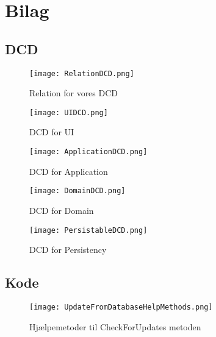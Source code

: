\section{Bilag}

\subsection{DCD}
\begin{figure}[H]
    \caption{Relation for vores DCD}
    \centering
        \texttt{[image: RelationDCD.png]}
    \label{bilag:RelationDCD}
\end{figure}

\newpage
\begin{sidewaysfigure}[h]
    \caption{DCD for UI}
    \centering
        \texttt{[image: UIDCD.png]}
    \label{bilag:UIDCD}
\end{sidewaysfigure}

\newpage
\begin{sidewaysfigure}[h]
    \caption{DCD for Application}
    \centering
        \texttt{[image: ApplicationDCD.png]}
    \label{bilag:ApplicationDCD}
\end{sidewaysfigure}

\newpage
\begin{figure}[h]
    \caption{DCD for Domain}
    \centering
        \texttt{[image: DomainDCD.png]}
    \label{bilag:DomainDCD}
\end{figure}

\begin{figure}[h]
    \caption{DCD for Persistency}
    \centering
        \texttt{[image: PersistableDCD.png]}
    \label{bilag:PersistableDCD}
\end{figure}


\subsection{Kode}

\begin{figure}[h]
    \caption{Hjælpemetoder til CheckForUpdates metoden}
    \centering
        \texttt{[image: UpdateFromDatabaseHelpMethods.png]}
    \label{bilag:CheckForUpdates }
\end{figure}




